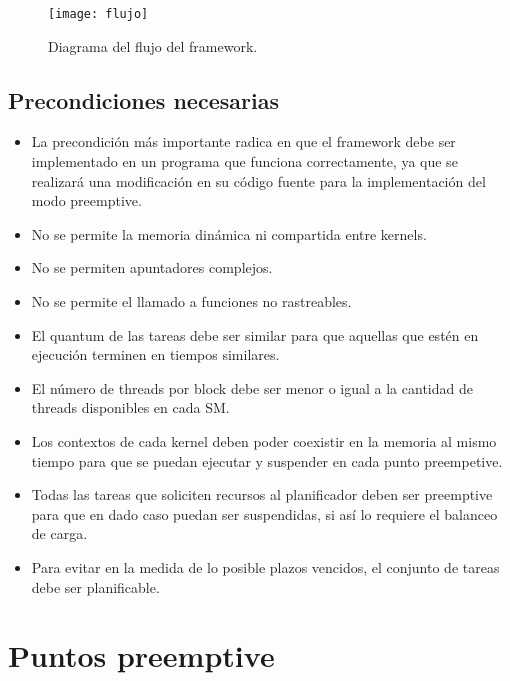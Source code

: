   \begin{figure}[!]
      \centering
        \texttt{[image: flujo]}
        \caption{Diagrama del flujo del framework.}
        \label{fig:flujo}
    \end{figure}

\subsection{Precondiciones necesarias} \label{secc:precondiciones}

\begin{itemize}
\item La precondición más importante radica en que el framework debe ser implementado en un programa que funciona correctamente, ya que se realizará una modificación en su código fuente para la implementación del modo preemptive.

\item No se permite la memoria dinámica ni compartida entre kernels.

\item No se permiten apuntadores complejos. 

\item No se permite el llamado a funciones no rastreables.

\item El quantum de las tareas debe ser similar para que aquellas que estén en ejecución terminen en tiempos similares.

\item El número de threads por block debe ser menor o igual a la cantidad de threads disponibles en cada SM.

 \item Los contextos de cada kernel deben poder coexistir en la memoria al mismo tiempo para que se puedan ejecutar y suspender en cada punto preempetive.

\item Todas las tareas que soliciten recursos al planificador deben ser preemptive para que en dado caso puedan ser suspendidas, si así lo requiere el balanceo de carga.

\item Para evitar en la medida de lo posible plazos vencidos, el conjunto de tareas debe ser planificable.

\end{itemize}

\section{Puntos preemptive}\label{secc:puntosPreemptive}

